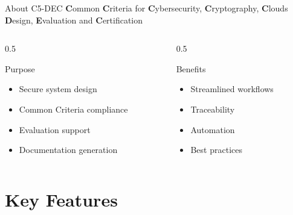 \documentclass[
  11pt,
  ignorenonframetext,
  aspectratio=169,
]{beamer}
\providecommand{\tightlist}{%
  \setlength{\itemsep}{0pt}\setlength{\parskip}{0pt}}\usepackage{longtable,booktabs,array}
\begin{document}
\begin{frame}{About C5-DEC}
\label{about-c5-dec}
\textbf{C}ommon \textbf{C}riteria for \textbf{C}ybersecurity,
\textbf{C}ryptography, \textbf{C}louds\\
\textbf{D}esign, \textbf{E}valuation and \textbf{C}ertification

\begin{columns}[T]
\begin{column}{0.5\linewidth}
\begin{block}{Purpose}
\label{purpose}
\begin{itemize}
\tightlist
\item
  Secure system design
\item
  Common Criteria compliance
\item
  Evaluation support
\item
  Documentation generation
\end{itemize}
\end{block}
\end{column}

\begin{column}{0.5\linewidth}
\begin{block}{Benefits}
\label{benefits}
\begin{itemize}
\tightlist
\item
  Streamlined workflows
\item
  Traceability
\item
  Automation
\item
  Best practices
\end{itemize}
\end{block}
\end{column}
\end{columns}
\end{frame}

\begin{frame}
\end{frame}

\section{Key Features}\label{key-features}
\end{document}
